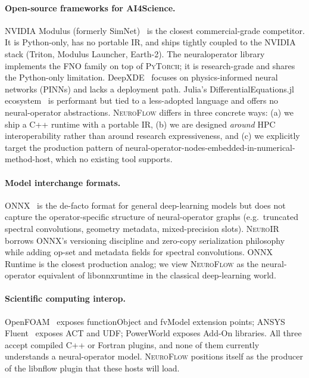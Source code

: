 \documentclass[10pt,twocolumn]{article}
\renewcommand{\texttt}[1]{{\normalfont\ttfamily #1}\normalfont\rmfamily}
\newcommand{\nf}{\textsc{NeuroFlow}}
\newcommand{\neuroir}{\textsc{NeuroIR}}
\newcommand{\py}{\textsc{PyTorch}}
\begin{document}
\paragraph{Open-source frameworks for AI4Science.}
NVIDIA Modulus (formerly SimNet)~\citep{modulus2022} is the closest
commercial-grade competitor.  It is Python-only, has no portable
IR, and ships tightly coupled to the NVIDIA stack (Triton, Modulus
Launcher, Earth-2).  The \texttt{neuraloperator} library
\cite{kovachki2023neuraloperator} implements the FNO family on top
of \py{}; it is research-grade and shares the Python-only
limitation.  DeepXDE~\cite{lu2021deepxde} focuses on physics-informed
neural networks (PINNs) and lacks a deployment path.  Julia's
\texttt{DifferentialEquations.jl}
ecosystem~\cite{rackauckas2017diffeq} is performant but tied to a
less-adopted language and offers no neural-operator abstractions.
%
\nf{} differs in three concrete ways: (a) we ship a C{++} runtime
with a portable IR, (b) we are designed \emph{around} HPC
interoperability rather than around research expressiveness, and
(c) we explicitly target the production pattern of
neural-operator-nodes-embedded-in-numerical-method-host, which no
existing tool supports.

\paragraph{Model interchange formats.}
ONNX~\cite{bai2019onnx} is the de-facto format for general
deep-learning models but does not capture the operator-specific
structure of neural-operator graphs (e.g.\ truncated spectral
convolutions, geometry metadata, mixed-precision slots).
\neuroir{} borrows ONNX's versioning discipline and zero-copy
serialization philosophy while adding op-set and metadata fields for
spectral convolutions.  ONNX Runtime is the closest production
analog; we view \nf{} as the neural-operator equivalent of
\texttt{libonnxruntime} in the classical deep-learning world.

\paragraph{Scientific computing interop.}
OpenFOAM~\cite{openfoam2024} exposes \texttt{functionObject} and
\texttt{fvModel} extension points; ANSYS Fluent~\cite{ansys2024}
exposes ACT and UDF; PowerWorld exposes Add-On libraries.  All
three accept compiled C{++} or Fortran plugins, and none of them
currently understands a neural-operator model.  \nf{} positions
itself as the producer of the \texttt{libnflow} plugin that these
hosts will load.
\end{document}
